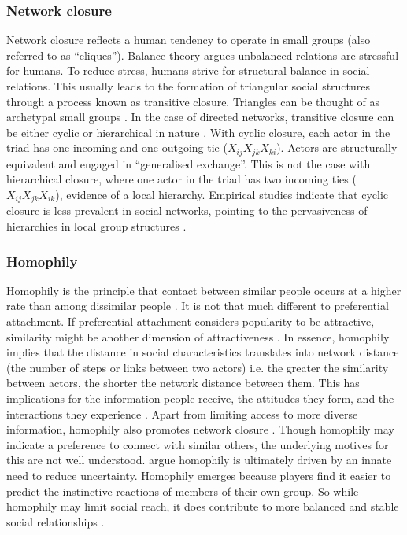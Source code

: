 \subsubsection{Network closure}

Network closure reflects a human tendency to operate in small groups (also referred to as \enquote{cliques}). Balance theory argues unbalanced relations are stressful for humans. To reduce stress, humans strive for structural balance in social relations. This usually leads to the formation of triangular social structures through a process known as transitive closure. Triangles can be thought of as archetypal small groups \citep{robins2015doing}. In the case of directed networks, transitive closure can be either cyclic or hierarchical in nature \citep{davis1967structure}. With cyclic closure, each actor in the triad has one incoming and one outgoing tie (\(X_{ij}X_{jk}X_{ki}\)). Actors are structurally equivalent and engaged in \enquote{generalised exchange}. This is not the case with hierarchical closure, where one actor in the triad has two incoming ties (\(X_{ij}X_{jk}X_{ik}\)), evidence of a local hierarchy. Empirical studies indicate that cyclic closure is less prevalent in social networks, pointing to the pervasiveness of hierarchies in local group structures \citep{davis1967structure}. \medskip

\subsubsection{Homophily}

Homophily is the principle that contact between similar people occurs at a higher rate than among dissimilar people \citep{mcpherson2001birds}. It is not that much different to preferential attachment. If preferential attachment considers popularity to be attractive, similarity might be another dimension of attractiveness \citep{wang2014homophily}. In essence, homophily implies that the distance in social characteristics translates into network distance (the number of steps or links between two actors) i.e. the greater the similarity between actors, the shorter the network distance between them. This has implications for the information people receive, the attitudes they form, and the interactions they experience \citep{mcpherson2001birds}. Apart from limiting access to more diverse information, homophily also promotes network closure \citep{kossinets2009origins}. Though homophily may indicate a preference to connect with similar others, the underlying motives for this are not well understood. \citet{kets2016belief} argue homophily is ultimately driven by an innate need to reduce uncertainty. Homophily emerges because players find it easier to predict the instinctive reactions of members of their own group. So while homophily may limit social reach, it does contribute to more balanced and stable social relationships \citep{scott2011sage,baccara2013homophily}. \medskip

